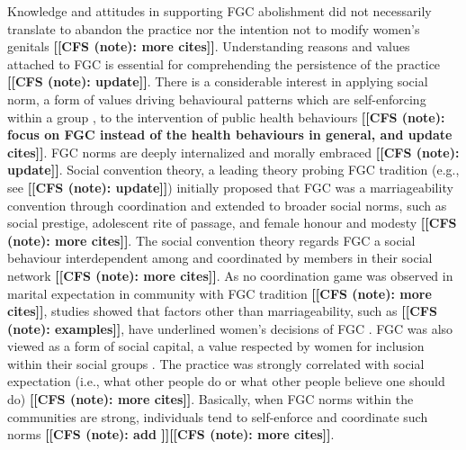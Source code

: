 \documentclass[12pt,]{article}
\newcommand{\comment}[1]{\textbf{[[#1]]}}
\newcommand{\cfonly}[1]{\comment{CFS (note): #1}}
\begin{document}
{Knowledge and attitudes in supporting FGC abolishment did not necessarily translate to abandon the practice nor the intention not to modify women's genitals \cite{ChegAske04, Bicc10, Cami15, CislHeis18, Mack96} \cfonly{more cites}.  Understanding reasons and values attached to FGC is essential for comprehending the persistence of the practice \cite{Bicc10, Cami15, CislHeis18, Mack96, Youn15} \cfonly{update}.  There is a considerable interest in applying social norm, a form of values driving behavioural patterns which are self-enforcing within a group \cite{Youn15}, to the intervention of public health behaviours \cite{Ajze91, Ajze02, CislHeis18a, MillPrin16, MollRima10, RimaLapi15} \cfonly{focus on FGC instead of the health behaviours in general, and update cites}.  FGC norms are deeply internalized and morally embraced \cite{SchuLien13} \cfonly{update}.  Social convention theory, a leading theory probing FGC tradition (e.g., see \cite{BoylMcMo02, BoylCorl10, FreyJohn07, FrieMahm13, Hayf05, KandMwek09, Mack96, Mack06, ReigGonz14, YirgKass12} \cfonly{update}) initially proposed that FGC was a marriageability convention through coordination \cite{Mack96} and extended to broader social norms, such as social prestige, adolescent rite of passage, and female honour and modesty \cite{Mack00, MackLeJe08} \cfonly{more cites}.   The social convention theory regards FGC a social behaviour interdependent among and coordinated by members in their social network \cite{Mack00, MackLeJe08, ShelWand11} \cfonly{more cites}.  As no coordination game was observed in marital expectation in community with FGC tradition \cite{EffeVogt15}\cfonly{more cites}, studies showed that factors other than marriageability, such as \cfonly{examples}, have underlined women’s  decisions of FGC \cite{AlcaGonz13, BellNova15, EffeVogt15, Hayf05, Mack09, PashPonn16, Rima08, ShelWand11, more?}.  FGC was also viewed as a form of social capital, a value respected by women for inclusion within their social groups \cite{ShelWand11}.   The practice was strongly correlated with social expectation (i.e., what other people do or what other people believe one should do)\cite{BiccMari15} \cfonly{more cites}.   Basically, when FGC norms within the communities are strong, individuals tend to self-enforce and coordinate such norms \cite{Ajze02, Hayf05, KandNwak09, KandShel19, Mack96, Mack06, MackLeJe08, ThomMadd92} \cfonly{add \cite{Bicc15}}\cfonly{more cites}.

}
\end{document}
